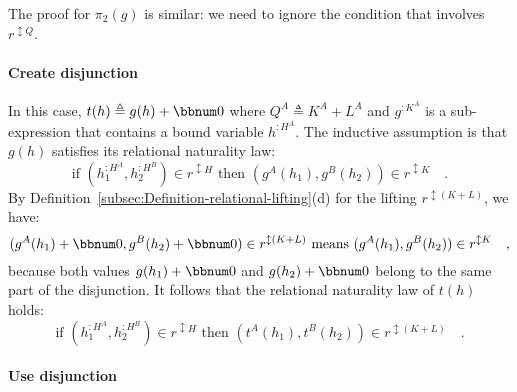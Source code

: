 The proof for $\pi_{2}(g)$ is similar: we need to ignore the condition
that involves $r^{\updownarrow Q}$.

\paragraph{Create disjunction}

In this case, $t(h)\triangleq g(h)+\bbnum 0$ where $Q^{A}\triangleq K^{A}+L^{A}$
and $g^{:K^{A}}$ is a sub-expression that contains a bound variable
$h^{:H^{A}}$. The inductive assumption is that $g(h)$ satisfies
its relational naturality law:
\[
\text{if }(h_{1}^{:H^{A}},h_{2}^{:H^{B}})\in r^{\updownarrow H}\text{ then }(g^{A}(h_{1}),g^{B}(h_{2}))\in r^{\updownarrow K}\quad.
\]
By Definition~\ref{subsec:Definition-relational-lifting}(d) for
the lifting $r^{\updownarrow(K+L)}$, we have:
\[
(g^{A}(h_{1})+\bbnum 0,g^{B}(h_{2})+\bbnum 0)\in r^{\updownarrow(K+L)}\text{ means }(g^{A}(h_{1}),g^{B}(h_{2}))\in r^{\updownarrow K}\quad,
\]
because both values $g(h_{1})+\bbnum 0$ and $g(h_{2})+\bbnum 0$
belong to the same part of the disjunction. It follows that the relational
naturality law of $t(h)$ holds:
\[
\text{if }(h_{1}^{:H^{A}},h_{2}^{:H^{B}})\in r^{\updownarrow H}\text{ then }(t^{A}(h_{1}),t^{B}(h_{2}))\in r^{\updownarrow(K+L)}\quad.
\]


\paragraph{Use disjunction}

